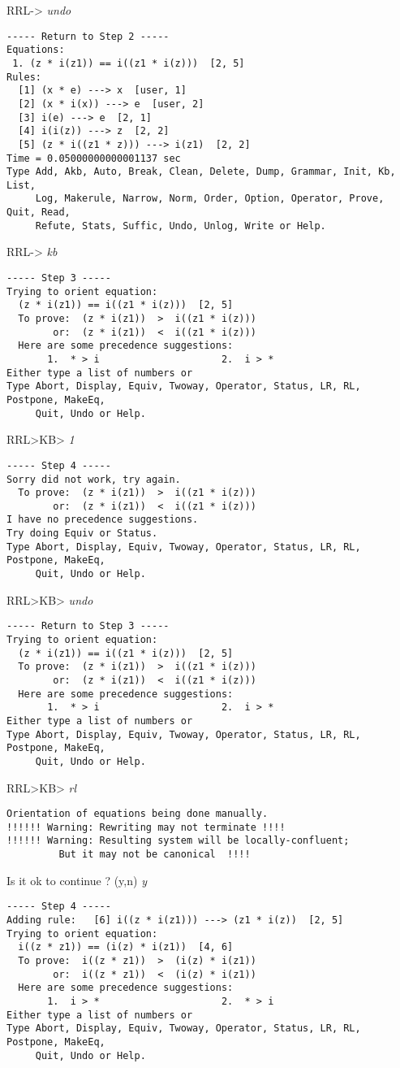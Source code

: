 RRL-> {\em undo}
\begin{verbatim}
----- Return to Step 2 -----
Equations:
 1. (z * i(z1)) == i((z1 * i(z)))  [2, 5]
Rules:
  [1] (x * e) ---> x  [user, 1]
  [2] (x * i(x)) ---> e  [user, 2]
  [3] i(e) ---> e  [2, 1]
  [4] i(i(z)) ---> z  [2, 2]
  [5] (z * i((z1 * z))) ---> i(z1)  [2, 2]
Time = 0.05000000000001137 sec
Type Add, Akb, Auto, Break, Clean, Delete, Dump, Grammar, Init, Kb, List,
     Log, Makerule, Narrow, Norm, Order, Option, Operator, Prove, Quit, Read,
     Refute, Stats, Suffic, Undo, Unlog, Write or Help.
\end{verbatim}
RRL-> {\em kb}
\begin{verbatim}
----- Step 3 -----
Trying to orient equation: 
  (z * i(z1)) == i((z1 * i(z)))  [2, 5]
  To prove:  (z * i(z1))  >  i((z1 * i(z)))
        or:  (z * i(z1))  <  i((z1 * i(z)))
  Here are some precedence suggestions:
       1.  * > i                     2.  i > *
Either type a list of numbers or
Type Abort, Display, Equiv, Twoway, Operator, Status, LR, RL, Postpone, MakeEq,
     Quit, Undo or Help.
\end{verbatim}
RRL>KB> {\em 1}
\begin{verbatim}
----- Step 4 -----
Sorry did not work, try again.
  To prove:  (z * i(z1))  >  i((z1 * i(z)))
        or:  (z * i(z1))  <  i((z1 * i(z)))
I have no precedence suggestions.  
Try doing Equiv or Status.
Type Abort, Display, Equiv, Twoway, Operator, Status, LR, RL, Postpone, MakeEq,
     Quit, Undo or Help.
\end{verbatim}
RRL>KB> {\em undo}
\begin{verbatim}
----- Return to Step 3 -----
Trying to orient equation: 
  (z * i(z1)) == i((z1 * i(z)))  [2, 5]
  To prove:  (z * i(z1))  >  i((z1 * i(z)))
        or:  (z * i(z1))  <  i((z1 * i(z)))
  Here are some precedence suggestions:
       1.  * > i                     2.  i > *
Either type a list of numbers or
Type Abort, Display, Equiv, Twoway, Operator, Status, LR, RL, Postpone, MakeEq,
     Quit, Undo or Help.
\end{verbatim}
RRL>KB> {\em rl}
\begin{verbatim}
Orientation of equations being done manually.
!!!!!! Warning: Rewriting may not terminate !!!!
!!!!!! Warning: Resulting system will be locally-confluent;
         But it may not be canonical  !!!!
\end{verbatim}
Is it ok to continue ? (y,n) {\em y}
\begin{verbatim}
----- Step 4 -----
Adding rule:   [6] i((z * i(z1))) ---> (z1 * i(z))  [2, 5]
Trying to orient equation: 
  i((z * z1)) == (i(z) * i(z1))  [4, 6]
  To prove:  i((z * z1))  >  (i(z) * i(z1))
        or:  i((z * z1))  <  (i(z) * i(z1))
  Here are some precedence suggestions:
       1.  i > *                     2.  * > i
Either type a list of numbers or
Type Abort, Display, Equiv, Twoway, Operator, Status, LR, RL, Postpone, MakeEq,
     Quit, Undo or Help.
\end{verbatim}
